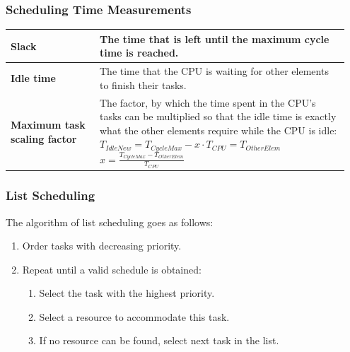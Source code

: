 		\subsubsection{Scheduling Time Measurements}
		\begin{table}[H]\centering
			\begin{tabular}{|p{0.25\linewidth}|p{0.7\linewidth}|}
				\hline
					\textbf{Slack}
						& The time that is left until the maximum cycle time is reached.\\
				\hline
					\textbf{Idle time}
						& The time that the CPU is waiting for other elements to finish their tasks.\\
				\hline
					\textbf{Maximum task scaling factor}
						& The factor, by which the time spent in the CPU's tasks can be multiplied so that the idle time is exactly what the other elements require while the CPU is idle: \newline 
						$T_{IdleNew} = T_{CycleMax} - x \cdot T_{CPU} = T_{OtherElem}$ \newline 
						{\Large $x = \frac{T_{CycleMax} - T_{OtherElem}}{T_{CPU}}$} \\
				\hline
			\end{tabular}
		\end{table}
		
		\subsubsection{List Scheduling}
			The algorithm of list scheduling goes as follows:
			
			\begin{enumerate}
				\item Order tasks with decreasing priority.
				\item Repeat until a valid schedule is obtained:
				\begin{enumerate}
				  \item Select the task with the highest priority.
				  \item Select a resource to accommodate this task.
				  \item If no resource can be found, select next task in the list.
				\end{enumerate}
			\end{enumerate}